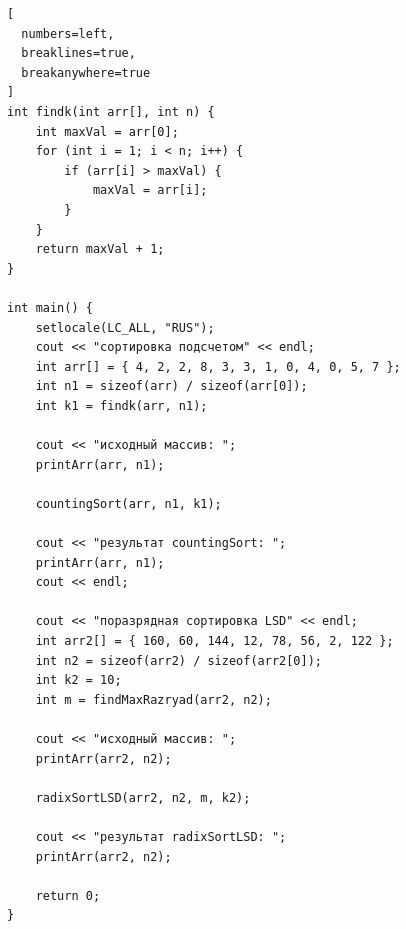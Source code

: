 \documentclass[otchet]{SCWorks}
\begin{document}
\begin{Verbatim}[
  numbers=left,
  breaklines=true,
  breakanywhere=true
]
int findk(int arr[], int n) {
    int maxVal = arr[0];
    for (int i = 1; i < n; i++) {
        if (arr[i] > maxVal) {
            maxVal = arr[i];
        }
    }
    return maxVal + 1;
}

int main() {
    setlocale(LC_ALL, "RUS");
    cout << "сортировка подсчетом" << endl;
    int arr[] = { 4, 2, 2, 8, 3, 3, 1, 0, 4, 0, 5, 7 };
    int n1 = sizeof(arr) / sizeof(arr[0]);
    int k1 = findk(arr, n1);

    cout << "исходный массив: ";
    printArr(arr, n1);

    countingSort(arr, n1, k1);

    cout << "результат countingSort: ";
    printArr(arr, n1);
    cout << endl;

    cout << "поразрядная сортировка LSD" << endl;
    int arr2[] = { 160, 60, 144, 12, 78, 56, 2, 122 };
    int n2 = sizeof(arr2) / sizeof(arr2[0]);
    int k2 = 10;
    int m = findMaxRazryad(arr2, n2);

    cout << "исходный массив: ";
    printArr(arr2, n2);

    radixSortLSD(arr2, n2, m, k2);

    cout << "результат radixSortLSD: ";
    printArr(arr2, n2);

    return 0;
}
\end{Verbatim}
\end{document}
